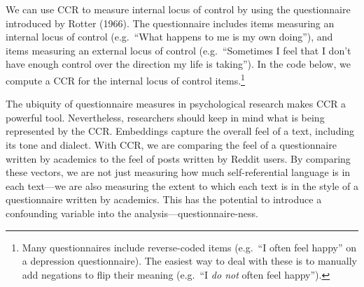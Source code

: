 \documentclass[
  man,
  floatsintext,
  longtable,
  nolmodern,
  notxfonts,
  notimes,
  colorlinks=true,linkcolor=blue,citecolor=blue,urlcolor=blue]{apa7}
\newenvironment{Shaded}{\begin{snugshade}}{\end{snugshade}}
\newcommand{\AttributeTok}[1]{\textcolor[rgb]{0.40,0.45,0.13}{#1}}
\newcommand{\CommentTok}[1]{\textcolor[rgb]{0.37,0.37,0.37}{#1}}
\newcommand{\ConstantTok}[1]{\textcolor[rgb]{0.56,0.35,0.01}{#1}}
\newcommand{\DecValTok}[1]{\textcolor[rgb]{0.68,0.00,0.00}{#1}}
\newcommand{\FunctionTok}[1]{\textcolor[rgb]{0.28,0.35,0.67}{#1}}
\newcommand{\NormalTok}[1]{\textcolor[rgb]{0.00,0.23,0.31}{#1}}
\newcommand{\OtherTok}[1]{\textcolor[rgb]{0.00,0.23,0.31}{#1}}
\newcommand{\SpecialCharTok}[1]{\textcolor[rgb]{0.37,0.37,0.37}{#1}}
\newcommand{\StringTok}[1]{\textcolor[rgb]{0.13,0.47,0.30}{#1}}
\begin{document}
We can use CCR to measure internal locus of control by using the
questionnaire introduced by Rotter (1966). The questionnaire includes
items measuring an internal locus of control (e.g.~``What happens to me
is my own doing''), and items measuring an external locus of control
(e.g.~``Sometimes I feel that I don't have enough control over the
direction my life is taking''). In the code below, we compute a CCR for
the internal locus of control items.\footnote{Many questionnaires
  include reverse-coded items (e.g.~``I often feel happy'' on a
  depression questionnaire). The easiest way to deal with these is to
  manually add negations to flip their meaning (e.g.~``I \emph{do not}
  often feel happy'').}

\begin{Shaded}
\end{Shaded}

The ubiquity of questionnaire measures in psychological research makes
CCR a powerful tool. Nevertheless, researchers should keep in mind what
is being represented by the CCR. Embeddings capture the overall feel of
a text, including its tone and dialect. With CCR, we are comparing the
feel of a questionnaire written by academics to the feel of posts
written by Reddit users. By comparing these vectors, we are not just
measuring how much self-referential language is in each text---we are
also measuring the extent to which each text is in the style of a
questionnaire written by academics. This has the potential to introduce
a confounding variable into the analysis---questionnaire-ness.
\end{document}

